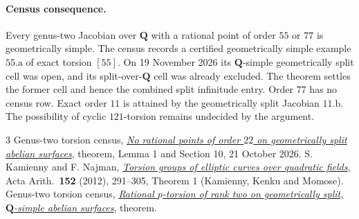 \documentclass[11pt]{article}
\newcommand{\Q}{\mathbf Q}
\begin{document}
\paragraph{Census consequence.} Every genus-two Jacobian over \(\Q\) with a rational point of order \(55\) or \(77\) is geometrically simple. The census records a certified geometrically simple example \href{https://genus-2-torsion.github.io/curve.html?id=55.a}{\(55.\mathrm{a}\)} of exact torsion \([55]\). On 19 November 2026 its \(\Q\)-simple geometrically split cell was open, and its split-over-\(\Q\) cell was already excluded. The theorem settles the former cell and hence the combined split infinitude entry. Order \(77\) has no census row. Exact order \(11\) is attained by the geometrically split Jacobian \href{https://genus-2-torsion.github.io/curve.html?id=11.b}{\(11.\mathrm{b}\)}. The possibility of cyclic \(121\)-torsion remains undecided by the argument.

\begin{thebibliography}{3}
 Genus-two torsion census, \href{https://genus-2-torsion.github.io/proofs/geometric-22-obstruction.html}{\emph{No rational points of order \(22\) on geometrically split abelian surfaces}}, theorem, Lemma 1 and Section 10, 21 October 2026.
 S. Kamienny and F. Najman, \href{https://arxiv.org/abs/1103.5906}{\emph{Torsion groups of elliptic curves over quadratic fields}}, Acta Arith.\ \textbf{152} (2012), 291--305, Theorem 1 (Kamienny, Kenku and Momose).
 Genus-two torsion census, \href{https://genus-2-torsion.github.io/proofs/qsimple-rank-two-obstruction.html}{\emph{Rational \(p\)-torsion of rank two on geometrically split, \(\Q\)-simple abelian surfaces}}, theorem.
\end{thebibliography}
\end{document}
